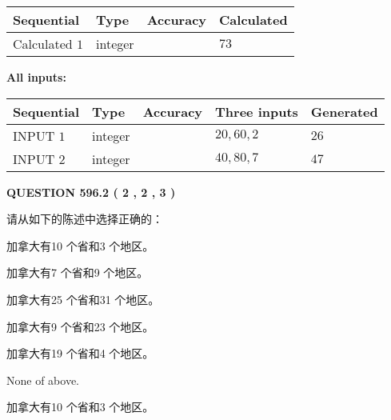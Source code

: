 \documentclass{ctexart}
\begin{document}
  
\noindent\begin{tabular}{|l|l|l|l|}
\hline
 Sequential & Type & Accuracy & Calculated \\ 
\hline
 
 
  Calculated $  1 $ & integer &  & 
  $ 73 $ 
 \\  \hline  
 \end{tabular}
   
   
   
   
\noindent\vspace{0.1in}\hspace{-0.08in} {\textbf{\Large{All inputs: }}}
   
   
  
  
\noindent\begin{tabular}{|l|l|l|l|l|}
\hline
 Sequential & Type & Accuracy & Three inputs & Generated \\ 
\hline
 
 
  INPUT $  1 $ & integer &  & $
 20
 , 
 60
 , 
 2
 $ & $ 26 $ 
 \\  \hline  
 
 
  INPUT $  2 $ & integer &  & $
 40
 , 
 80
 , 
 7
 $ & $ 47 $ 
 \\  \hline  
 \end{tabular}
   
   
  
\vspace{0.2in}
  
{\textbf{\Large{QUESTION
596.2 
 ( 2 , 2 , 3 )
}}}
  
  
请从如下的陈述中选择正确的：
 
 
加拿大有10 个省和3 个地区。
 
 
加拿大有7 个省和9 个地区。
 
 
加拿大有25 个省和31 个地区。
 
 
加拿大有9 个省和23 个地区。
 
 
加拿大有19 个省和4 个地区。
 
 
 None of above.
 
 
\noindent{}
 
 
加拿大有10 个省和3 个地区。
 
 
\noindent{}
 
\end{document}
